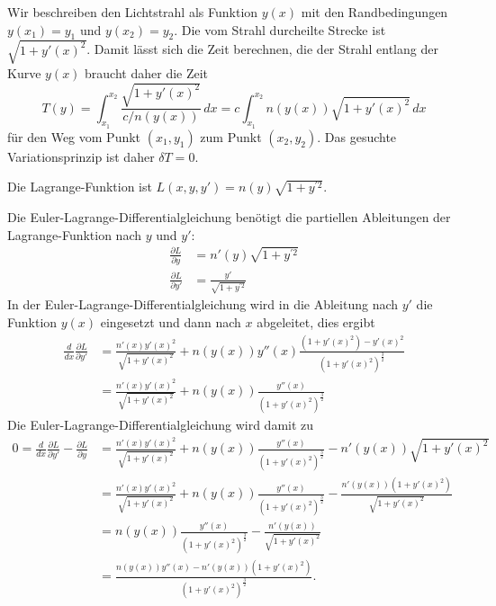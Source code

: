 \begin{loesung}
\begin{teilaufgaben}
\item
Wir beschreiben den Lichtstrahl als Funktion $y(x)$ mit den Randbedingungen
\(
y(x_1)=y_1
\)
und
\(
y(x_2)=y_2
\).
Die vom Strahl durcheilte Strecke ist $\!\sqrt{1+y'(x)^2}$.
Damit lässt sich die Zeit berechnen, die der Strahl entlang der
Kurve $y(x)$ braucht daher die Zeit
\[
T(y)
=
\int_{x_1}^{x_2}
\frac{\!\sqrt{1+y'(x)^2}}{c/n(y(x))}
\,dx
=
c
\int_{x_1}^{x_2}
n(y(x))
\sqrt{1+y'(x)^2}
\,dx
\]
für den Weg vom Punkt $(x_1,y_1)$ zum Punkt $(x_2,y_2)$.
Das gesuchte Variationsprinzip ist daher $\delta T=0$.
\item
Die Lagrange-Funktion ist
\(
L(x,y,y') = n(y)\sqrt{1+y^{\prime 2}}
\).
\item
Die Euler-Lagrange-Differentialgleichung benötigt die partiellen
Ableitungen der Lagrange-Funktion nach $y$ und $y'$:
\begin{align*}
\frac{\partial L}{\partial y}
&=
n'(y) \sqrt{1+y^{\prime 2}}
\\
\frac{\partial L}{\partial y'}
&=
\frac{y'}{\!\sqrt{1+y^{\prime 2}}}
\end{align*}
In der Euler-Lagrange-Differentialgleichung wird in die Ableitung nach $y'$
die Funktion $y(x)$ eingesetzt und dann nach $x$ abgeleitet, dies ergibt
\begin{align*}
\frac{d}{dx}
\frac{\partial L}{\partial y'}
&=
\frac{n'(x) y'(x)^2}{\!\sqrt{1+y'(x)^2}}
+
n(y(x))
y''(x)
\frac{
(1+y'(x)^2) - y'(x)^2
}{
(1+y'(x)^2)^{\frac32}
}
\\
&=
\frac{n'(x) y'(x)^2}{\!\sqrt{1+y'(x)^2}}
+
n(y(x))
\frac{
y''(x)
}{
(1+y'(x)^2)^{\frac32}
}
\end{align*}
Die Euler-Lagrange-Differentialgleichung wird damit zu
\begin{align*}
0
=
\frac{d}{dx}\frac{\partial L}{\partial y'}
-
\frac{\partial L}{\partial y}
&=
\frac{n'(x) y'(x)^2}{\!\sqrt{1+y'(x)^2}}
+
n(y(x))
\frac{
y''(x)
}{
(1+y'(x)^2)^{\frac32}
}
-
n'(y(x))\sqrt{1+y'(x)^2}
\\
&=
\frac{
n'(x) y'(x)^2
}{
\!\sqrt{1+y'(x)^2}
}
+
n(y(x))
\frac{
y''(x)
}{
(1+y'(x)^2)^{\frac32}
}
-
\frac{
n'(y(x))(1+y'(x)^2)
}{
\!\sqrt{1+y'(x)^2}
}
\\
&=
n(y(x))
\frac{
y''(x)
}{
(1+y'(x)^2)^{\frac32}
}
-
\frac{
n'(y(x))
}{
\!\sqrt{1+y'(x)^2}
}
\\
&=
\frac{
n(y(x))
y''(x)
-
n'(y(x))
(1+y'(x)^2)
}{
(1+y'(x)^2)^{\frac32}
}.
\end{align*}

\end{teilaufgaben}
\end{loesung}
